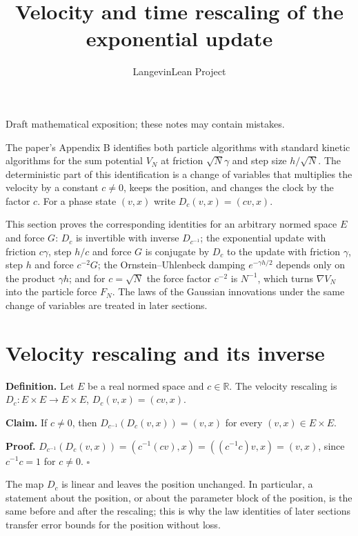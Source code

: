 \documentclass[11pt,a4paper]{article}
\title{\texorpdfstring{Velocity and time rescaling of the exponential update}{Velocity and time rescaling of the exponential update}}
\author{LangevinLean Project}
\date{}
\begin{document}
\maketitle
Draft mathematical exposition; these notes may contain mistakes.


The paper's Appendix B identifies both particle algorithms with standard kinetic algorithms for the sum potential \(V_N\) at friction \(\sqrt N\gamma\) and step size \(h/\sqrt N\). The deterministic part of this identification is a change of variables that multiplies the velocity by a constant \(c\ne0\), keeps the position, and changes the clock by the factor \(c\). For a phase state \((v,x)\) write \(D_c(v,x)=(cv,x)\).




This section proves the corresponding identities for an arbitrary normed space \(E\) and force \(G\): \(D_c\) is invertible with inverse \(D_{c^{-1}}\); the exponential update with friction \(c\gamma\), step \(h/c\) and force \(G\) is conjugate by \(D_c\) to the update with friction \(\gamma\), step \(h\) and force \(c^{-2}G\); the Ornstein–Uhlenbeck damping \(e^{-\gamma h/2}\) depends only on the product \(\gamma h\); and for \(c=\sqrt N\) the force factor \(c^{-2}\) is \(N^{-1}\), which turns \(\nabla V_N\) into the particle force \(F_N\). The laws of the Gaussian innovations under the same change of variables are treated in later sections.


\section{\texorpdfstring{Velocity rescaling and its inverse}{Velocity rescaling and its inverse}}


\textbf{Definition.} Let \(E\) be a real normed space and \(c\in\mathbb R\). The velocity rescaling is \(D_c:E\times E\to E\times E\), \(D_c(v,x)=(cv,x)\).




\textbf{Claim.} If \(c\ne0\), then \(D_{c^{-1}}(D_c(v,x))=(v,x)\) for every \((v,x)\in E\times E\).




\textbf{Proof.} \(D_{c^{-1}}(D_c(v,x))=(c^{-1}(cv),x)=((c^{-1}c)v,x)=(v,x)\), since \(c^{-1}c=1\) for \(c\ne0\). \(\square\)




The map \(D_c\) is linear and leaves the position unchanged. In particular, a statement about the position, or about the parameter block of the position, is the same before and after the rescaling; this is why the law identities of later sections transfer error bounds for the position without loss.
\end{document}
